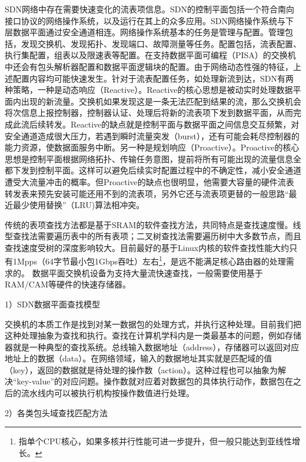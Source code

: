 SDN网络中存在需要快速变化的流表项信息。SDN的控制平面包括一个符合南向接口协议的网络操作系统，以及运行在其上的众多应用。SDN网络操作系统与下层数据平面通过安全通道相连。网络操作系统基本的任务是管理与配置。管理包括，发现交换机、发现拓扑、发现端口、故障测量等任务。配置包括，流表配置、执行集配置，组表以及限速表等配置。在支持数据平面可编程（PISA）的交换机中还会有包头解析器配置和数据平面逻辑块的配置。由于网络动态性强的特征，上述配置内容均可能快速发生。针对于流表配置任务，如处理新流到达，SDN有两种策略，一种是动态响应（Reactive）。Reactive的核心思想是被动实时处理数据平面内出现的新流量。交换机如果发现这是一条无法匹配到结果的流，那么交换机会将次信息上报控制器，控制器认证、处理后将新的流表项下发到数据平面，从而完成此流后续转发。Reactive的缺点就是控制平面与数据平面之间信息交互频繁，对安全通道造成很大压力，若遇到瞬时流量突发（burst），还有可能会耗尽控制器的能力资源，使数据面服务中断。另一种是规划响应（Proactive）。Proactive的核心思想是控制平面根据网络拓扑、传输任务意图，提前将所有可能出现的流量信息全都下发到控制平面。这样可以避免后续实时配置过程中的不确定性，减小安全通道遭受大流量冲击的概率。但Proactive的缺点也很明显，他需要大容量的硬件流表转发表来预先安装可能还用不到的流表项，另外它还与流表项更替的一般思路“最近最少使用替换”（LRU)算法相冲突。




传统的表项查找方法都是基于SRAM的软件查找方法，共同特点是查找速度慢。线型查找法需要遍历表中的所有表项；二叉树查找法需要遍历树中大多数节点，而且查找速度受树的深度影响较大。目前最好的基于Linux内核的软件查找性能大约只有1Mpps（64字节最小包1Gbps吞吐）左右\footnote{指单个CPU核心，如果多核并行性能可进一步提升，但一般只能达到亚线性增长。}，是远不能满足核心路由器的处理需求的。
数据平面交换机设备为支持大量流快速查找，一般需要使用基于RAM/CAM等硬件的快速存储器。

1）SDN数据平面查找模型

交换机的本质工作是找到对某一数据包的处理方式，并执行这种处理。目前我们把这种处理抽象为查找和执行。查找在计算机学科内是一类最基本的问题，例如存储器就是一种典型的查找系统。总线输入数据地址（address），存储器可以返回对应地址上的数据（data）。在网络领域，输入的数据地址其实就是匹配域的值（key），返回的数据就是待处理的操作数（action）。这种过程也可以抽象为解决“key-value”的对应问题。操作数就对应着对数据包的具体执行动作，数据包在之后的流水线内可以被执行机构按操作数值进行处理。

2）各类包头域查找匹配方法

